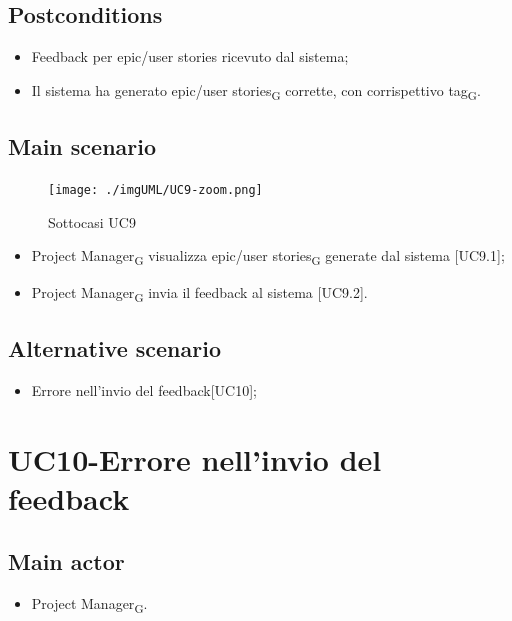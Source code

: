 \documentclass{article}
\begin{document}
    \subsection*{Postconditions}
        \begin{itemize}
            \item Feedback per epic/user stories ricevuto dal sistema;
            \item Il sistema ha generato epic/user stories\textsubscript{G} corrette, con corrispettivo tag\textsubscript{G}.
        \end{itemize}
        
    \subsection*{Main scenario}
        \begin{figure}[h]
          \centering
          \texttt{[image: ./imgUML/UC9-zoom.png]}
          \caption{Sottocasi UC9}
          \label{fig:UC9_sottocasi}
        \end{figure}

        \begin{itemize}
            \item Project Manager\textsubscript{G} visualizza epic/user stories\textsubscript{G} generate dal sistema [UC9.1];
            \item Project Manager\textsubscript{G} invia il feedback al sistema [UC9.2].
        \end{itemize}
        
    \subsection*{Alternative scenario}
        
        \begin{itemize}
            \item Errore nell'invio del feedback[UC10];
        \end{itemize}
        
\section{UC10-Errore nell'invio del feedback}

     \subsection*{Main actor}
     \begin{itemize}
         \item Project Manager\textsubscript{G}.
     \end{itemize}
\end{document}
